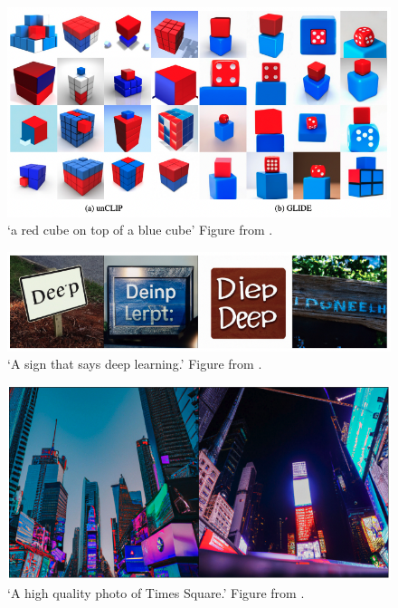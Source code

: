 \documentclass[
]{krantz}
\begin{document}
\begin{figure}

{\centering \includegraphics[width=1\linewidth]{figures/02-02-text-2-img/cube} 

}

\caption{`a red cube on top of a blue cube' Figure from \citet{DALLE2}.}\label{fig:cube}
\end{figure}



\begin{figure}

{\centering \includegraphics[width=1\linewidth]{figures/02-02-text-2-img/sign} 

}

\caption{`A sign that says deep learning.' Figure from \citet{DALLE2}.}\label{fig:sign}
\end{figure}



\begin{figure}

{\centering \includegraphics[width=1\linewidth]{figures/02-02-text-2-img/timessquare} 

}

\caption{`A high quality photo of Times Square.' Figure from \citet{DALLE2}.}\label{fig:timessquare}
\end{figure}
\end{document}
